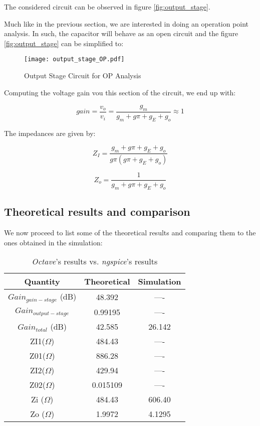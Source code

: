 The considered circuit can be observed in figure \ref{fig:output_stage}.


Much like in the previous section, we are interested in doing an operation point analysis. In such, the capacitor will behave as an open circuit and the figure \ref{fig:output_stage} can be simplified to:

\begin{figure}[h!]
\centering
\texttt{[image: output\_stage\_OP.pdf]}
\caption{Output Stage Circuit for OP Analysis}
\label{fig:output_stage_figure_OP}
\end{figure}


Computing the voltage gain vou this section of the circuit, we end up with:

\begin{equation}
gain=\frac{v_o}{v_i}=\frac{g_m}{g_m+g{\pi}+g_E+g_o} \approx 1
\end{equation}

The impedances are given by:

\begin{equation}
Z_I=\frac{g_m+g{\pi}+g_E+g_o}{g{\pi}(g{\pi}+g_E+g_o)}
\end{equation}


\begin{equation}
Z_o=\frac{1}{g_m+g{\pi}+g_E+g_o}
\end{equation}

\subsection {Theoretical results and comparison}

We now proceed to list some of the theoretical results and comparing them to the ones obtained in the simulation:

\begin{center}
    \begin{table}[H]
        \centering
        \begin{tabular}{c|c|c}
          \textbf{Quantity} & \textbf{Theoretical}  & \textbf{Simulation}  \\
          \hline
            $Gain_{gain-stage}$ (dB) &	48.392  & ---- \\
            $Gain_{output-stage}$  &	0.99195  & ----\\
            $Gain_{total}$ (dB)   &	42.585 & 26.142 \\
            ZI1($\Omega$)  &	484.43 & ----\\
            Z01($\Omega$)  &	886.28 & ----\\
            ZI2($\Omega$)  &	429.94 & ----\\
            Z02($\Omega$) & 0.015109 & ----\\
            Zi ($\Omega$)& 484.43 & 606.40\\
            Zo ($\Omega$)& 1.9972 & 4.1295\\
        \end{tabular}
        \caption{\textit{Octave}'s results vs. \textit{ngspice}'s results}
    \end{table}
\end{center}

